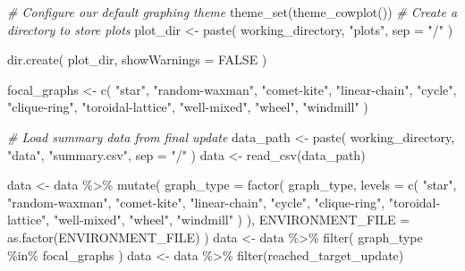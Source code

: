 \documentclass[
]{book}
\newenvironment{Shaded}{\begin{snugshade}}{\end{snugshade}}
\newcommand{\AttributeTok}[1]{\textcolor[rgb]{0.77,0.63,0.00}{#1}}
\newcommand{\CommentTok}[1]{\textcolor[rgb]{0.56,0.35,0.01}{\textit{#1}}}
\newcommand{\ConstantTok}[1]{\textcolor[rgb]{0.00,0.00,0.00}{#1}}
\newcommand{\FunctionTok}[1]{\textcolor[rgb]{0.00,0.00,0.00}{#1}}
\newcommand{\NormalTok}[1]{#1}
\newcommand{\OtherTok}[1]{\textcolor[rgb]{0.56,0.35,0.01}{#1}}
\newcommand{\SpecialCharTok}[1]{\textcolor[rgb]{0.00,0.00,0.00}{#1}}
\newcommand{\StringTok}[1]{\textcolor[rgb]{0.31,0.60,0.02}{#1}}
\begin{document}
\begin{Shaded}
\begin{Highlighting}[]
\CommentTok{\# Configure our default graphing theme}
\FunctionTok{theme\_set}\NormalTok{(}\FunctionTok{theme\_cowplot}\NormalTok{())}
\CommentTok{\# Create a directory to store plots}
\NormalTok{plot\_dir }\OtherTok{\textless{}{-}} \FunctionTok{paste}\NormalTok{(}
\NormalTok{  working\_directory,}
  \StringTok{"plots"}\NormalTok{,}
  \AttributeTok{sep =} \StringTok{"/"}
\NormalTok{)}

\FunctionTok{dir.create}\NormalTok{(}
\NormalTok{  plot\_dir,}
  \AttributeTok{showWarnings =} \ConstantTok{FALSE}
\NormalTok{)}
\end{Highlighting}
\end{Shaded}

\begin{Shaded}
\begin{Highlighting}[]
\NormalTok{focal\_graphs }\OtherTok{\textless{}{-}} \FunctionTok{c}\NormalTok{(}
  \StringTok{"star"}\NormalTok{,}
  \StringTok{"random{-}waxman"}\NormalTok{,}
  \StringTok{"comet{-}kite"}\NormalTok{,}
  \StringTok{"linear{-}chain"}\NormalTok{,}
  \StringTok{"cycle"}\NormalTok{,}
  \StringTok{"clique{-}ring"}\NormalTok{,}
  \StringTok{"toroidal{-}lattice"}\NormalTok{,}
  \StringTok{"well{-}mixed"}\NormalTok{,}
  \StringTok{"wheel"}\NormalTok{,}
  \StringTok{"windmill"}
\NormalTok{)}

\CommentTok{\# Load summary data from final update}
\NormalTok{data\_path }\OtherTok{\textless{}{-}} \FunctionTok{paste}\NormalTok{(}
\NormalTok{  working\_directory,}
  \StringTok{"data"}\NormalTok{,}
  \StringTok{"summary.csv"}\NormalTok{,}
  \AttributeTok{sep =} \StringTok{"/"}
\NormalTok{)}
\NormalTok{data }\OtherTok{\textless{}{-}} \FunctionTok{read\_csv}\NormalTok{(data\_path)}

\NormalTok{data }\OtherTok{\textless{}{-}}\NormalTok{ data }\SpecialCharTok{\%\textgreater{}\%}
  \FunctionTok{mutate}\NormalTok{(}
    \AttributeTok{graph\_type =} \FunctionTok{factor}\NormalTok{(}
\NormalTok{      graph\_type,}
      \AttributeTok{levels =} \FunctionTok{c}\NormalTok{(}
        \StringTok{"star"}\NormalTok{,}
        \StringTok{"random{-}waxman"}\NormalTok{,}
        \StringTok{"comet{-}kite"}\NormalTok{,}
        \StringTok{"linear{-}chain"}\NormalTok{,}
        \StringTok{"cycle"}\NormalTok{,}
        \StringTok{"clique{-}ring"}\NormalTok{,}
        \StringTok{"toroidal{-}lattice"}\NormalTok{,}
        \StringTok{"well{-}mixed"}\NormalTok{,}
        \StringTok{"wheel"}\NormalTok{,}
        \StringTok{"windmill"}
\NormalTok{      )}
\NormalTok{    ),}
    \AttributeTok{ENVIRONMENT\_FILE =} \FunctionTok{as.factor}\NormalTok{(ENVIRONMENT\_FILE)}
\NormalTok{  )}
\NormalTok{data }\OtherTok{\textless{}{-}}\NormalTok{ data }\SpecialCharTok{\%\textgreater{}\%} \FunctionTok{filter}\NormalTok{(}
\NormalTok{  graph\_type }\SpecialCharTok{\%in\%}\NormalTok{ focal\_graphs}
\NormalTok{)}
\NormalTok{data }\OtherTok{\textless{}{-}}\NormalTok{ data }\SpecialCharTok{\%\textgreater{}\%} \FunctionTok{filter}\NormalTok{(reached\_target\_update)}
\end{Highlighting}
\end{Shaded}
\end{document}
